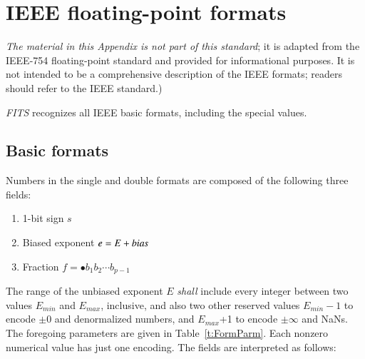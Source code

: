 \documentclass[onecolumn]{aa}
\begin{document}
\section{IEEE floating-point formats}
   \label{s:IEEE754}

 {\em The material in this Appendix is not part
 of this standard}; it is adapted from the IEEE-754
 floating-point standard \citep{ieee85} and provided for
 informational purposes. It is not intended to be a comprehensive
 description of the IEEE formats; readers should refer to the IEEE
 standard.)                                                          
 
 {\em FITS\/} recognizes all IEEE basic formats, 
 including the special values.
 
\subsection{Basic formats}
 Numbers in the single and double formats are composed of the following
 three fields:
 \begin{enumerate}
  \item 1-bit sign $s$ 
  \item Biased exponent $e=E+\mbox{{\it bias}}$ 
  \item Fraction $f= \bullet b_{1} b_{2} \cdots b_{p-1}$
 \end{enumerate} 
The range of the unbiased exponent $E$ {\em shall} include every integer
between two values $E_{min}$ and $E_{max}$, inclusive, and
also two other reserved values $E_{min}-1$ to encode $\pm 0$ and
denormalized numbers, and $E_{max}$+1 to encode $\pm\infty$ and
NaNs. The foregoing parameters are given in Table~\ref{t:FormParm}. 
Each nonzero numerical value has just one encoding.  The fields are
interpreted as follows:                                     
\end{document}

